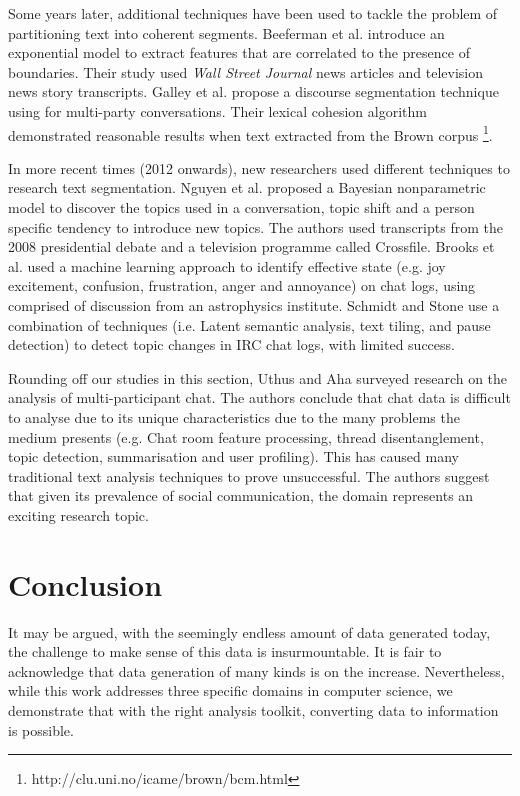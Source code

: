 Some years later, additional techniques have been used to tackle the problem of partitioning text into coherent segments. Beeferman et al. \cite{beeferman1999statistical} introduce an exponential model to extract features that are correlated to the presence of boundaries. Their study used \textit{Wall Street Journal} news articles and television news story transcripts.  Galley et al. \cite{galley2003discourse} propose a discourse segmentation technique using for multi-party conversations. Their lexical cohesion algorithm demonstrated reasonable results when text extracted from the Brown corpus \footnote{http://clu.uni.no/icame/brown/bcm.html}. 

In more recent times (2012 onwards), new researchers used different techniques to research text segmentation. Nguyen et al. \cite{nguyen2012sits} proposed a Bayesian nonparametric model to discover the topics used in a conversation, topic shift and a person specific tendency to introduce new topics. The authors used transcripts from the 2008 presidential debate and a television programme called Crossfile. Brooks et al. \cite{brooks2013statistical} used a machine learning approach to identify effective state (e.g. joy excitement, confusion, frustration, anger and annoyance) on chat logs, using comprised of discussion from an astrophysics institute. Schmidt and Stone \cite{schmidt2013detection} use a combination of techniques (i.e. Latent semantic analysis, text tiling, and pause detection) to detect topic changes in IRC chat logs, with limited success.  

Rounding off our studies in this section, Uthus and Aha \cite{uthus2013multiparticipant} surveyed research on the analysis of multi-participant chat. The authors conclude that chat data is difficult to analyse due to its unique characteristics due to the many problems the medium presents (e.g. Chat room feature processing, thread disentanglement, topic detection, summarisation and user profiling). This has caused many traditional text analysis techniques to prove unsuccessful. The authors suggest that given its prevalence of social communication, the domain represents an exciting research topic. 

\section{Conclusion}

It may be argued, with the seemingly endless amount of data generated today, the challenge to make sense of this data is insurmountable. It is fair to acknowledge that data generation of many kinds is on the increase. Nevertheless, while this work addresses three specific domains in computer science, we demonstrate that with the right analysis toolkit, converting data to information is possible.

